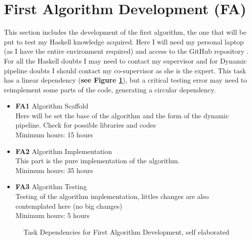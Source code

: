 \section{First Algorithm Development \textbf{(FA)}}
This section includes the development of the first algorithm, the one that will be put to test my Haskell knowledge acquired.
Here I will need my personal laptop (as I have the entire environment required) and access to the GitHub repository \cite{GitHubTFG}.
For all the Haskell doubts I may need to contact my supervisor and for Dynamic pipeline doubts I should contact my co-supervisor as she is the expert.
This task has a linear dependency (\textbf{see Figure \ref{FA_dependences}}), but a critical testing error may need to reimplement some parts of the code, generating a circular dependency.
\begin{itemize}
    \item \textbf{FA1} Algorithm Scaffold \\
        Here will be set the base of the algorithm and the form of the dynamic pipeline.
        Check for possible libraries and codes \\
        Minimum hours: 15 hours
    \item \textbf{FA2} Algorithm Implementation\\
        This part is the pure implementation of the algorithm. \\
        Minimum hours: 35 hours
    \item \textbf{FA3} Algorithm Testing \\
        Testing of the algorithm implementation, littles changes are also contemplated here (no big changes) \\
        Minimum hours: 5 hours 
\end{itemize}
\begin{figure}[h]
    \centering
    \caption{Task Dependencies for First Algorithm Development, self elaborated}
    \label{FA_dependences}
\end{figure}


